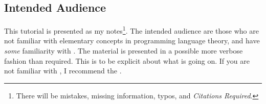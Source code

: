\subsection{Intended Audience}
\label{sec:intro:audience}

This tutorial is presented as my notes\footnote{There will be mistakes, missing information, typos, and \emph{Citations Required}.}.
The intended audience are those who are not familiar with elementary concepts in programming language theory, and have \emph{some} familiarity with \idris{}.
The material is presented in a possible more verbose fashion than required.
This is to be explicit about what is going on.
If you are not familiar with \idris{}, I recommend the \cite{Community2014}.
